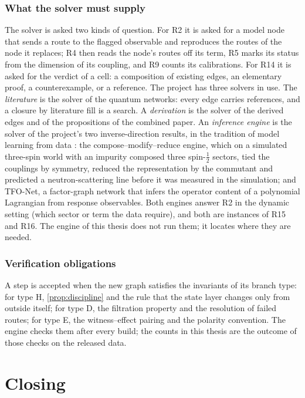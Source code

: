 \documentclass[11pt,a4paper,twoside,openany]{report}
\theoremstyle{plain}
\theoremstyle{definition}
\theoremstyle{remark}
\begin{document}
\section{What the solver must supply}\label{sec:solvers}
The solver is asked two kinds of question. For R2 it is asked for a model node that sends a route to the flagged observable and reproduces the routes of the node it replaces; R4 then reads the node's routes off its term, R5 marks its status from the dimension of its coupling, and R9 counts its calibrations. For R14 it is asked for the verdict of a cell: a composition of existing edges, an elementary proof, a counterexample, or a reference. The project has three solvers in use. The \emph{literature} is the solver of the quantum networks: every edge carries references, and a closure by literature fill is a search. A \emph{derivation} is the solver of the derived edges and of the propositions of the combined paper. An \emph{inference engine} is the solver of the project's two inverse-direction results, in the tradition of model learning from data \citep{brunton2016,wu2019,gentile2021}: the compose--modify--reduce engine, which on a simulated three-spin world with an impurity composed three spin-$\tfrac12$ sectors, tied the couplings by symmetry, reduced the representation by the commutant and predicted a neutron-scattering line before it was measured in the simulation; and TFO-Net, a factor-graph network that infers the operator content of a polynomial Lagrangian from response observables. Both engines answer R2 in the dynamic setting (which sector or term the data require), and both are instances of R15 and R16. The engine of this thesis does not run them; it locates where they are needed.

\section{Verification obligations}
A step is accepted when the new graph satisfies the invariants of its branch type: for type H, \cref{prop:discipline} and the rule that the state layer changes only from outside itself; for type D, the filtration property and the resolution of failed routes; for type E, the witness--effect pairing and the polarity convention. The engine checks them after every build; the counts in this thesis are the outcome of those checks on the released data.



\part{Closing}\label{part:closing}
\end{document}
